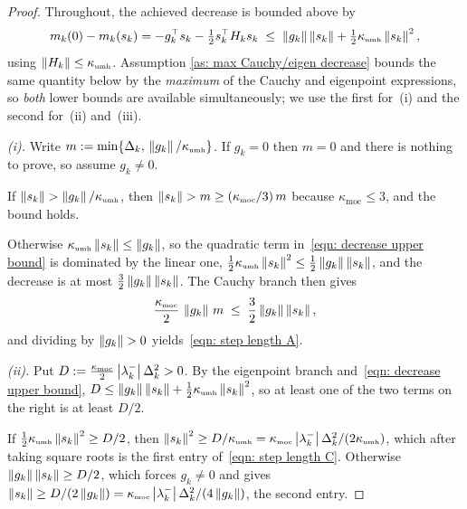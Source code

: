 \documentclass[11pt]{article}
\theoremstyle{plain}
\theoremstyle{definition}
\theoremstyle{remark}
\numberwithin{equation}{section}
\providecommand{\defeq}{\mathrel{:=}}
\newcommand*\mykappa[1]{\kappa_{\scriptscriptstyle\text{#1}}}
\begin{document}
\begin{proof}
    Throughout, the achieved decrease is bounded above by
    \begin{equation}
        m_k(0) - m_k(s_k)
          = -g_k^\top s_k - \tfrac12 s_k^\top H_k s_k
          \;\leq\; \norm{g_k}\norm{s_k} + \tfrac12\mykappa{umh}\norm{s_k}^2 ,
        \label{eqn: decrease upper bound}
    \end{equation}
    using $\norm{H_k} \leq \mykappa{umh}$. Assumption \ref{as: max Cauchy/eigen decrease} bounds
    the same quantity below by the \emph{maximum} of the Cauchy and eigenpoint expressions, so
    \emph{both} lower bounds are available simultaneously; we use the first for~(i) and the second
    for~(ii) and~(iii).

    \emph{(i).} Write $m \defeq \min\{\Delta_k,\, \norm{g_k}/\mykappa{umh}\}$. If $g_k = 0$ then
    $m = 0$ and there is nothing to prove, so assume $g_k \neq 0$.

    If $\norm{s_k} > \norm{g_k}/\mykappa{umh}$, then
    $\norm{s_k} > m \geq (\mykappa{moc}/3)\,m$ because $\mykappa{moc} \leq 3$, and the bound holds.

    Otherwise $\mykappa{umh}\norm{s_k} \leq \norm{g_k}$, so the quadratic term
    in~\eqref{eqn: decrease upper bound} is dominated by the linear one,
    $\tfrac12\mykappa{umh}\norm{s_k}^2 \leq \tfrac12\norm{g_k}\norm{s_k}$, and the decrease is at
    most $\tfrac32\left \lVert g_k \right \rVert\left \lVert s_k \right \rVert$. The Cauchy branch then gives
    \begin{equation*}
        \frac{\mykappa{moc}}{2}\,\norm{g_k}\, m \;\leq\; \frac32 \norm{g_k}\norm{s_k} ,
    \end{equation*}
    and dividing by $\left \lVert g_k \right \rVert > 0$ yields~\eqref{eqn: step length A}.

    \emph{(ii).} Put $D \defeq \tfrac{\mykappa{moc}}{2}\abs{\lambda_k^-}\Delta_k^2 > 0$. By the
    eigenpoint branch and~\eqref{eqn: decrease upper bound},
    $D \leq \norm{g_k}\norm{s_k} + \tfrac12\mykappa{umh}\norm{s_k}^2$, so at least one of the two
    terms on the right is at least $D/2$.

    If $\tfrac12\mykappa{umh}\norm{s_k}^2 \geq D/2$, then
    $\norm{s_k}^2 \geq D/\mykappa{umh} = \mykappa{moc}\abs{\lambda_k^-}\Delta_k^2/(2\mykappa{umh})$,
    which after taking square roots is the first entry of~\eqref{eqn: step length C}. Otherwise
    $\left \lVert g_k \right \rVert\left \lVert s_k \right \rVert \geq D/2$, which forces $g_k \neq 0$ and gives
    $\norm{s_k} \geq D/(2\norm{g_k}) = \mykappa{moc}\abs{\lambda_k^-}\Delta_k^2/(4\norm{g_k})$, the
    second entry.


\end{proof}
\end{document}
